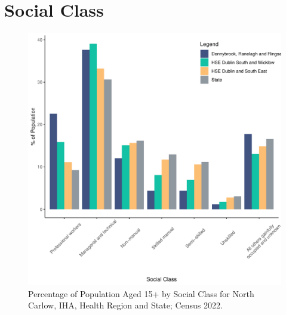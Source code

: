 \documentclass{article}
\begin{document}
\section{Social Class}\label{sect:SC}
\begin{figure}[H]
	\centering
	\includegraphics[width = 140mm]{../figures/SocialClassED.pdf}
	\caption{Percentage of Population Aged 15+ by Social Class for North Carlow, IHA, Health Region and State; Census 2022.}
	\label{fig:vbnv}
	\end{figure}
\end{document}
